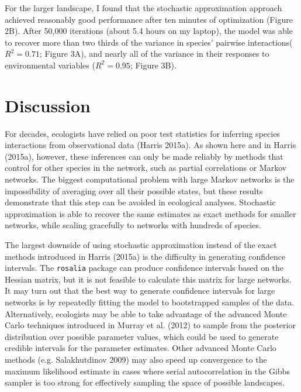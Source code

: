 \documentclass[12pt,]{article}
\begin{document}
\begin{spacing}{1.9}
\begin{flushleft}
For the larger landscape, I found that the stochastic approximation
approach achieved reasonably good performance after ten minutes of
optimization (Figure 2B). After 50,000 iterations (about 5.4 hours on my
laptop), the model was able to recover more than two thirds of the
variance in species' pairwise interactions(\(R^2 = 0.71\); Figure 3A),
and nearly all of the variance in their responses to environmental
variables (\(R^2 = 0.95\); Figure 3B).

\section{Discussion}\label{discussion}

For decades, ecologists have relied on poor test statistics for
inferring species interactions from observational data (Harris 2015a).
As shown here and in Harris (2015a), however, these inferences can only
be made reliably by methods that control for other species in the
network, such as partial correlations or Markov networks. The biggest
computational problem with large Markov networks is the impossibility of
averaging over all their possible states, but these results demonstrate
that this step can be avoided in ecological analyses. Stochastic
approximation is able to recover the same estimates as exact methods for
smaller networks, while scaling gracefully to networks with hundreds of
species.

The largest downside of using stochastic approximation instead of the
exact methods introduced in Harris (2015a) is the difficulty in
generating confidence intervals. The \texttt{rosalia} package can
produce confidence intervals based on the Hessian matrix, but it is not
feasible to calculate this matrix for large networks. It may turn out
that the best way to generate confidence intervals for large networks is
by repeatedly fitting the model to bootstrapped samples of the data.
Alternatively, ecologists may be able to take advantage of the advanced
Monte Carlo techniques introduced in Murray et al. (2012) to sample from
the posterior distribution over possible parameter values, which could
be used to generate credible intervals for the parameter estimates.
Other advanced Monte Carlo methods (e.g. Salakhutdinov 2009) may also
speed up convergence to the maximum likelihood estimate in cases where
serial autocorrelation in the Gibbs sampler is too strong for
effectively sampling the space of possible landscapes.


\end{flushleft}
\end{spacing}
\end{document}
